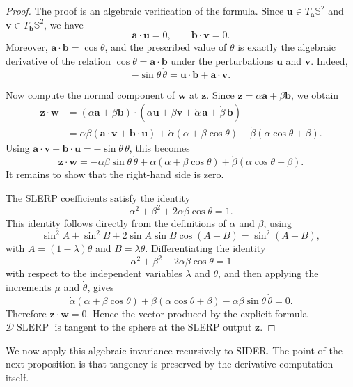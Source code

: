 \documentclass[a4paper,11pt]{article}
\newcommand{\bz}{\mathbf{z}}
\newcommand{\ba}{\mathbf{a}}
\newcommand{\bb}{\mathbf{b}}
\newcommand{\bu}{\mathbf{u}}
\newcommand{\bv}{\mathbf{v}}
\newcommand{\bw}{\mathbf{w}}
\numberwithin{equation}{section}
\theoremstyle{plain}
\theoremstyle{definition}
\theoremstyle{remark}
\newcommand{\slerp}{\operatorname{SLERP}}
\begin{document}
\begin{proof}
The proof is an algebraic verification of the formula.  Since \(\bu\in T_{\ba}\mathbb{S}^2\) and \(\bv\in T_{\bb}\mathbb{S}^2\), we have
\[
        \ba\cdot\bu=0,\qquad \bb\cdot\bv=0 .
\]
Moreover, \(\ba\cdot\bb=\cos\theta\), and the prescribed value of \(\dot\theta\) is exactly the algebraic derivative of the relation \(\cos\theta=\ba\cdot\bb\) under the perturbations \(\bu\) and \(\bv\).  Indeed,
\[
        -\sin\theta\,\dot\theta
        =
        \bu\cdot\bb+\ba\cdot\bv .
\]

Now compute the normal component of \(\bw\) at \(\bz\).  Since \(\bz=\alpha\ba+\beta\bb\), we obtain
\[
\begin{aligned}
        \bz\cdot\bw
        &=
        (\alpha\ba+\beta\bb)\cdot
        \left(\alpha\bu+\beta\bv+\dot\alpha\,\ba+\dot\beta\,\bb\right)  \\
        &=
        \alpha\beta(\ba\cdot\bv+\bb\cdot\bu)
        +
        \dot\alpha(\alpha+\beta\cos\theta)
        +
        \dot\beta(\alpha\cos\theta+\beta).
\end{aligned}
\]
Using \(\ba\cdot\bv+\bb\cdot\bu=-\sin\theta\,\dot\theta\), this becomes
\[
        \bz\cdot\bw
        =
        -\alpha\beta\sin\theta\,\dot\theta
        +
        \dot\alpha(\alpha+\beta\cos\theta)
        +
        \dot\beta(\alpha\cos\theta+\beta).
\]
It remains to show that the right-hand side is zero.

The SLERP coefficients satisfy the identity
\[
        \alpha^2+\beta^2+2\alpha\beta\cos\theta=1 .
\]
This identity follows directly from the definitions of \(\alpha\) and \(\beta\), using
\[
        \sin^2 A+\sin^2 B+2\sin A\sin B\cos(A+B)=\sin^2(A+B),
\]
with \(A=(1-\lambda)\theta\) and \(B=\lambda\theta\).  Differentiating the identity
\[
        \alpha^2+\beta^2+2\alpha\beta\cos\theta=1
\]
with respect to the independent variables \(\lambda\) and \(\theta\), and then applying the increments \(\mu\) and \(\dot\theta\), gives
\[
        \dot\alpha(\alpha+\beta\cos\theta)
        +
        \dot\beta(\alpha\cos\theta+\beta)
        -
        \alpha\beta\sin\theta\,\dot\theta
        =
        0 .
\]
Therefore \(\bz\cdot\bw=0\).  Hence the vector produced by the explicit formula \(\mathcal{D}\slerp\) is tangent to the sphere at the SLERP output \(\bz\).
\end{proof}

We now apply this algebraic invariance recursively to SIDER.  The point of the next proposition is that tangency is preserved by the derivative computation itself.
\end{document}
